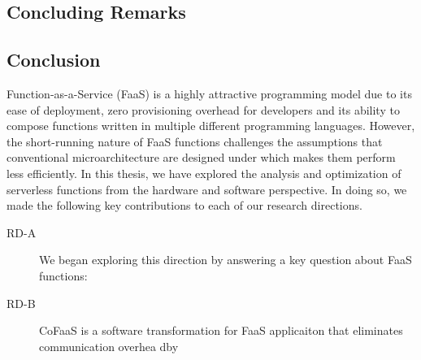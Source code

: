 \documentclass[../main.tex]{subfiles}
\begin{document}
\ifx\chapincluded\undefined
  \begin{refsection}
 \fi

\chapter{Concluding Remarks}
\label{chap:conclusions}
\section{Conclusion}
Function-as-a-Service (FaaS) is a highly attractive programming model
due to its ease of deployment, zero provisioning overhead for
developers and its ability to compose functions written in multiple
different programming languages. However, the short-running nature of
FaaS functions challenges the assumptions that conventional
microarchitecture are designed under which makes them perform less
efficiently. In this thesis, we have explored the analysis and
optimization of serverless functions from the hardware and software
perspective. In doing so, we made the following key contributions to each of our research directions.

\begin{description}

\item[RD-A] We began exploring this direction by answering a key question about FaaS functions: 

\item[RD-B] CoFaaS is a software transformation for FaaS applicaiton that eliminates communication overhea dby 

\end{description}




 


\ifx\chapincluded\undefined
  \printbibliography
  \end{refsection}
 \fi
\end{document}
